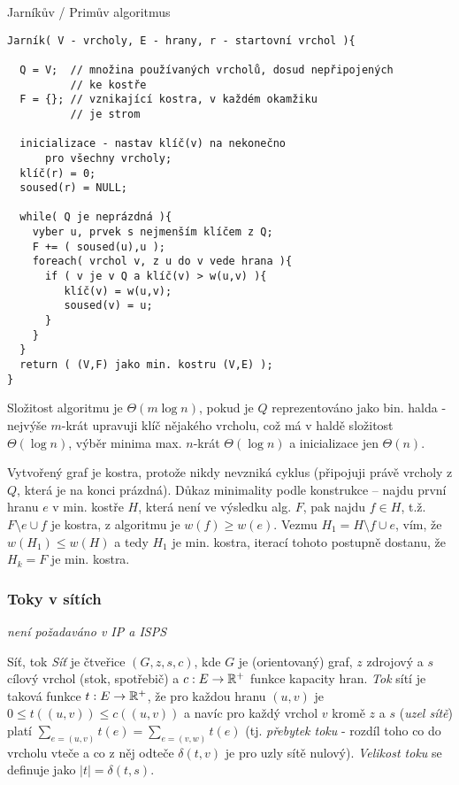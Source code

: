 \begin{algoritmusN}{Jarníkův / Primův algoritmus }
\begin{verbatim}
Jarník( V - vrcholy, E - hrany, r - startovní vrchol ){

  Q = V;  // množina používaných vrcholů, dosud nepřipojených
          // ke kostře
  F = {}; // vznikající kostra, v každém okamžiku 
          // je strom

  inicializace - nastav klíč(v) na nekonečno
      pro všechny vrcholy;
  klíč(r) = 0;
  soused(r) = NULL;

  while( Q je neprázdná ){
    vyber u, prvek s nejmenším klíčem z Q;
    F += ( soused(u),u );
    foreach( vrchol v, z u do v vede hrana ){
      if ( v je v Q a klíč(v) > w(u,v) ){
         klíč(v) = w(u,v);
         soused(v) = u;
      }
    }
  }
  return ( (V,F) jako min. kostru (V,E) );
}
\end{verbatim}

Složitost algoritmu je $\Theta(m\log n)$, pokud je $Q$ reprezentováno jako bin. halda - nejvýše $m$-krát upravuji klíč nějakého vrcholu, což má v haldě složitost $\Theta(\log n)$, výběr minima max. $n$-krát $\Theta(\log n)$ a inicializace jen $\Theta(n)$.

Vytvořený graf je kostra, protože nikdy nevzniká cyklus (připojuji právě vrcholy z $Q$, která je na konci prázdná). Důkaz minimality podle konstrukce -- najdu první hranu $e$ v min. kostře $H$, která není ve výsledku alg. $F$, pak najdu $f\in H$, t.ž.  $F\setminus e\cup f$ je kostra, z algoritmu je $w(f)\geq w(e)$. Vezmu $H_1=H\setminus f\cup e$, vím, že $w(H_1)\leq w(H)$ a tedy $H_1$ je min. kostra, iterací tohoto postupně dostanu, že $H_k=F$ je min. kostra.
\end{algoritmusN}


\subsubsection*{Toky v sítích}

\emph{není požadaváno v IP a ISPS}

\begin{definiceN}{Síť, tok}
\emph{Síť} je čtveřice $(G,z,s,c)$, kde $G$ je (orientovaný) graf, $z$ zdrojový a $s$ cílový vrchol (stok, spotřebič) a $c:E\to\mathbb{R}^{+}$ funkce kapacity hran. \emph{Tok} sítí je taková funkce $t:E\to\mathbb{R}^{+}$, že pro každou hranu $(u,v)$ je $0\leq t((u,v))\leq c((u,v))$ a navíc pro každý vrchol $v$ kromě $z$ a $s$ (\emph{uzel sítě}) platí $\sum_{e=(u,v)}t(e) = \sum_{e=(v,w)}t(e)$ (tj. \emph{přebytek toku} - rozdíl toho co do vrcholu vteče a co z něj odteče $\delta(t,v)$ je pro uzly sítě nulový). \emph{Velikost toku} se definuje jako $|t|=\delta(t,s)$.
\end{definiceN}

